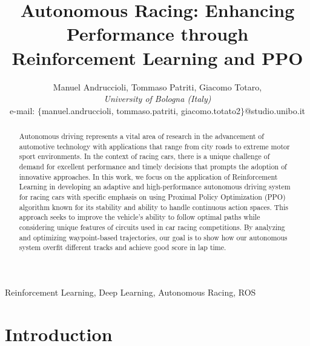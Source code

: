 \documentclass[conference]{IEEEtran}
\begin{document}
\title{
    Autonomous Racing: Enhancing Performance through Reinforcement Learning and PPO
}

\author{Manuel Andruccioli,
Tommaso Patriti,
Giacomo Totaro,\\ 
\textit{University of Bologna (Italy)} \\
e-mail: $\{$manuel.andruccioli, tommaso.patriti, giacomo.totato2$\}$@studio.unibo.it }

\maketitle

\begin{abstract}
Autonomous driving represents a vital area of research in the advancement of automotive technology with applications that range from city roads to extreme motor sport environments.
%
In the context of racing cars, there is a unique challenge of demand for excellent performance and timely decisions that prompts the adoption of innovative approaches.
%
In this work, we focus on the application of Reinforcement Learning in developing an adaptive and high-performance autonomous driving system for racing cars with specific emphasis on using Proximal Policy Optimization (PPO) algorithm known for its stability and ability to handle continuous action spaces.
%
This approach seeks to improve the vehicle's ability to follow optimal paths while considering unique features of circuits used in car racing competitions.
%
By analyzing and optimizing waypoint-based trajectories, our goal is to show how our autonomous system overfit different tracks and achieve good score in lap time.
%
%
%
\end{abstract}


\begin{IEEEkeywords}
    Reinforcement Learning, Deep Learning, Autonomous Racing, ROS
\end{IEEEkeywords}

\section{Introduction}
\end{document}
